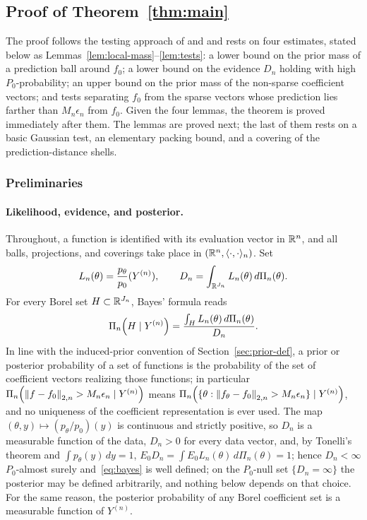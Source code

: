 \subsection*{Proof of Theorem~\ref{thm:main}}

The proof follows the testing approach of \citet{Ghosal2000} and \citet{Ghosal2007} and rests on four estimates, stated below as Lemmas~\ref{lem:local-mass}--\ref{lem:tests}: a lower bound on the prior mass of a prediction ball around $f_0$; a lower bound on the evidence $D_n$ holding with high $P_0$-probability; an upper bound on the prior mass of the non-sparse coefficient vectors; and tests separating $f_0$ from the sparse vectors whose prediction lies farther than $M_n\epsilon_n$ from $f_0$. Given the four lemmas, the theorem is proved immediately after them. The lemmas are proved next; the last of them rests on a basic Gaussian test, an elementary packing bound, and a covering of the prediction-distance shells.

\subsubsection*{Preliminaries}

\paragraph*{Likelihood, evidence, and posterior.}
Throughout, a function is identified with its evaluation vector in $\mathbb{R}^n$, and all balls, projections, and coverings take place in $(\mathbb{R}^n,\langle\cdot,\cdot\rangle_n)$. Set
\begin{align*}
L_n(\theta)=\frac{p_\theta}{p_0}(Y^{(n)}),
\qquad
D_n=\int_{\mathbb{R}^{J_n}}L_n(\theta)\,d\Pi_n(\theta).
\end{align*}
For every Borel set $H\subset\mathbb{R}^{J_n}$, Bayes' formula reads
\begin{align}
\Pi_n\!\left(H\mid Y^{(n)}\right)=\frac{\int_HL_n(\theta)\,d\Pi_n(\theta)}{D_n}.
\label{eq:bayes}
\end{align}
In line with the induced-prior convention of Section~\ref{sec:prior-def}, a prior or posterior probability of a set of functions is the probability of the set of coefficient vectors realizing those functions; in particular $\Pi_n\!\left(\left\lVert f-f_0 \right\rVert_{2,n}>M_n\epsilon_n\mid Y^{(n)}\right)$ means $\Pi_n\!\left(\{\theta:\left\lVert f_\theta-f_0 \right\rVert_{2,n}>M_n\epsilon_n\}\mid Y^{(n)}\right)$, and no uniqueness of the coefficient representation is ever used. The map $(\theta,y)\mapsto(p_\theta/p_0)(y)$ is continuous and strictly positive, so $D_n$ is a measurable function of the data, $D_n>0$ for every data vector, and, by Tonelli's theorem and $\int p_\theta(y)\,dy=1$, $E_0D_n=\int E_0L_n(\theta)\,d\Pi_n(\theta)=1$; hence $D_n<\infty$ $P_0$-almost surely and~\eqref{eq:bayes} is well defined; on the $P_0$-null set $\{D_n=\infty\}$ the posterior may be defined arbitrarily, and nothing below depends on that choice. For the same reason, the posterior probability of any Borel coefficient set is a measurable function of $Y^{(n)}$.

